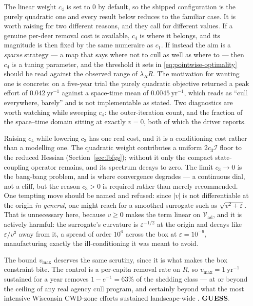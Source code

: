 \documentclass[11pt]{article}
\newcommand{\tagGUESS}{{\footnotesize\textsf{\textbf{\textcolor{red!70!black}{GUESS}}}}}
\newcommand{\Vad}{\mathcal{V}_{\mathrm{ad}}}
\begin{document}
The linear weight $c_4$ is set to $0$ by default, so the shipped configuration is the purely quadratic one and every result below reduces to the familiar case. It is worth raising for two different reasons, and they call for different values. If a genuine per-deer removal cost is available, $c_4$ is where it belongs, and its magnitude is then fixed by the same numeraire as $c_1$. If instead the aim is a \emph{sparse} strategy --- a map that says where not to cull as well as where to --- then $c_4$ is a tuning parameter, and the threshold it sets in \eqref{eq:pointwise-optimality} should be read against the observed range of $\lambda_R R$. The motivation for wanting one is concrete: on a five-year trial the purely quadratic objective returned a peak effort of $0.042\ \mathrm{yr}^{-1}$ against a space-time mean of $0.0045\ \mathrm{yr}^{-1}$, which reads as ``cull everywhere, barely'' and is not implementable as stated. Two diagnostics are worth watching while sweeping $c_4$: the outer-iteration count, and the fraction of the space--time domain sitting at exactly $v=0$, both of which the driver reports.

Raising $c_4$ while lowering $c_3$ has one real cost, and it is a conditioning cost rather than a modelling one. The quadratic weight contributes a uniform $2c_3\mathcal{I}$ floor to the reduced Hessian (Section~\ref{sec:lbfgs}); without it only the compact state-coupling operator remains, and its spectrum decays to zero. The limit $c_3\to0$ is the bang-bang problem, and is where convergence degrades --- a continuous dial, not a cliff, but the reason $c_3>0$ is required rather than merely recommended. One tempting move should be named and refused: since $|v|$ is not differentiable at the origin \emph{in general}, one might reach for a smoothed surrogate such as $\sqrt{v^2+\varepsilon}$. That is unnecessary here, because $v\ge0$ makes the term linear on $\Vad$, and it is actively harmful: the surrogate's curvature is $\varepsilon^{-1/2}$ at the origin and decays like $\varepsilon/v^3$ away from it, a spread of order $10^6$ across the box at $\varepsilon=10^{-6}$, manufacturing exactly the ill-conditioning it was meant to avoid.

The bound $v_{\max}$ deserves the same scrutiny, since it is what makes the box constraint bite. The control is a per-capita removal rate on $R$, so $v_{\max} = 1\ \mathrm{yr}^{-1}$ sustained for a year removes $1 - e^{-1} = 63\%$ of the shedding class --- at or beyond the ceiling of any real agency cull program, and certainly beyond what the most intensive Wisconsin CWD-zone efforts sustained landscape-wide \citep{Wasserberg2009}. \tagGUESS{}. 
\end{document}
